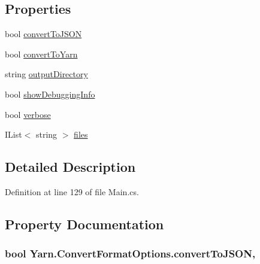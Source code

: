 \subsection*{Properties}
\begin{DoxyCompactItemize}
\item 
bool \hyperlink{a00058_a6a650914fcde92ba06fb5f140af27f11}{convert\-To\-J\-S\-O\-N}
\item 
bool \hyperlink{a00058_a052d6f00647c503adc5a79a1ff92cdf4}{convert\-To\-Yarn}
\item 
string \hyperlink{a00058_ab636bde93c2204b2af1a9306560d9749}{output\-Directory}
\item 
bool \hyperlink{a00041_a89964ea17bd19caf00cb5bff563ed01c}{show\-Debugging\-Info}
\item 
bool \hyperlink{a00041_ada4d83d1756918f362d55f6649b82b17}{verbose}
\item 
I\-List$<$ string $>$ \hyperlink{a00041_aa93cbb1bc1d5328e0a417012621e92d2}{files}
\end{DoxyCompactItemize}


\subsection{Detailed Description}


Definition at line 129 of file Main.\-cs.



\subsection{Property Documentation}
\hypertarget{a00058_a6a650914fcde92ba06fb5f140af27f11}{
\subsubsection[{convert\-To\-J\-S\-O\-N}]{\setlength{\rightskip}{0pt plus 5cm}bool Yarn.\-Convert\-Format\-Options.\-convert\-To\-J\-S\-O\-N\hspace{0.3cm}{\ttfamily [get]}, {\ttfamily [set]}}}\label{a00058_a6a650914fcde92ba06fb5f140af27f11}


